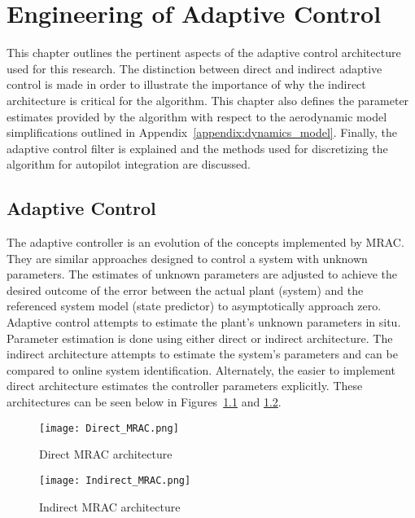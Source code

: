\chapter{Engineering of Adaptive Control}\label{ch:adaptive_controller}
This chapter outlines the pertinent aspects of the \Lone adaptive control architecture used for this research.  The distinction between direct and indirect adaptive control is made in order to illustrate the importance of why the indirect architecture is critical for the \Lone algorithm.  This chapter also defines the parameter estimates provided by the \Lone algorithm with respect to the aerodynamic model simplifications outlined in Appendix~\ref{appendix:dynamics_model}.  Finally, the \Lone adaptive control filter is explained and the methods used for discretizing the algorithm for autopilot integration are discussed.

\section{\Lone Adaptive Control}
The \Lone adaptive controller is an evolution of the concepts implemented by \ac{MRAC}.  They are similar approaches designed to control a system with unknown parameters.  The estimates of unknown parameters are adjusted to achieve the desired outcome of the error between the actual plant (system) and the referenced system model (state predictor) to asymptotically approach zero.   Adaptive control attempts to estimate the plant's unknown parameters in situ.  Parameter estimation is done using either direct or indirect architecture.  The indirect architecture attempts to estimate the system's parameters and can be compared to online system identification.  Alternately, the easier to implement direct architecture estimates the controller parameters explicitly.  These architectures can be seen below in Figures~\ref{fig:direct_mrac} and \ref{fig:indirect_mrac}.

\begin{figure}[h!]
 \centering
  \texttt{[image: Direct\_MRAC.png]}
  \caption{Direct \ac{MRAC} architecture }
  \label{fig:direct_mrac}
\end{figure}

\begin{figure}[h!]
 \centering
  \texttt{[image: Indirect\_MRAC.png]}
  \caption{Indirect \ac{MRAC} architecture }
  \label{fig:indirect_mrac}
\end{figure}

